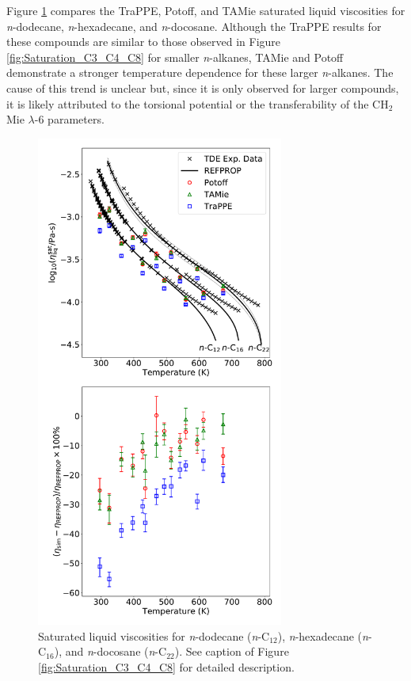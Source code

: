 \documentclass[preprint,review,12pt]{elsarticle}
\begin{document}
	Figure \ref{fig:Saturation_C12_C16_C22} compares the TraPPE, Potoff, and TAMie saturated liquid viscosities for \textit{n}-dodecane, \textit{n}-hexadecane, and \textit{n}-docosane. Although the TraPPE results for these compounds are similar to those observed in Figure \ref{fig:Saturation_C3_C4_C8} for smaller \textit{n}-alkanes, TAMie and Potoff demonstrate a stronger temperature dependence for these larger \textit{n}-alkanes. The cause of this trend is unclear but, since it is only observed for larger compounds, it is likely attributed to the torsional potential or the transferability of the CH$_2$ Mie $\lambda$-6 parameters.  
	
	\begin{figure}[htb!]
		\centering
		\includegraphics[width=3.2in]{compare_force_fields_long_normal.pdf}
		\caption{Saturated liquid viscosities for \textit{n}-dodecane (\textit{n}-C$_{12}$), \textit{n}-hexadecane (\textit{n}-C$_{16}$), and \textit{n}-docosane (\textit{n}-C$_{22}$). See caption of Figure \ref{fig:Saturation_C3_C4_C8} for detailed description.}
		\label{fig:Saturation_C12_C16_C22}
	\end{figure} 
	
\end{document}
